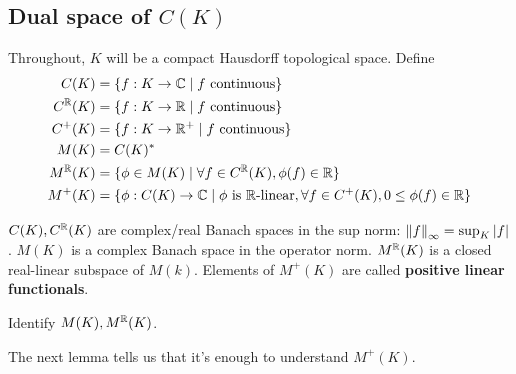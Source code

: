 \documentclass{article}
\begin{document}
\clearpage

\subsection{Dual space of \texorpdfstring{$C(K)$}{C(K)}}

Throughout, $K$ will be a compact Hausdorff topological space. Define
\begin{align*}
  C(K) & = \{f : K \to \mathbb C \mid f \text{ continuous}\} \\
  C^\mathbb R(K) & = \{f : K \to \mathbb R \mid f \text{ continuous}\} \\
  C^+(K) & = \{f : K \to \mathbb R^+ \mid f \text{ continuous}\} \\
  M(K) & = C(K)^* \\
  M^\mathbb R(K) & = \{\phi \in M(K) \mid \forall f \in C^\mathbb R(K), \phi(f) \in \mathbb R\} \\
  M^+(K) & = \{\phi : C(K) \to \mathbb C \mid \phi \text{ is $\mathbb R$-linear}, \forall f \in C^+(K), 0 \le \phi(f) \in \mathbb R\}
\end{align*}

$C(K), C^\mathbb R(K)$ are complex/real Banach spaces in the sup norm: $\left\lVert f\right\rVert_\infty = \sup_K \left\lvert f\right\rvert$. $M(K)$ is a complex Banach space in the operator norm. $M^\mathbb R(K)$ is a closed real-linear subspace of $M(k)$. Elements of $M^+(K)$ are called {\bf positive linear functionals}.

\begin{aim}
  Identify $M(K), M^\mathbb R(K)$.
\end{aim}

\newlec

The next lemma tells us that it's enough to understand $M^+(K)$.
\end{document}
